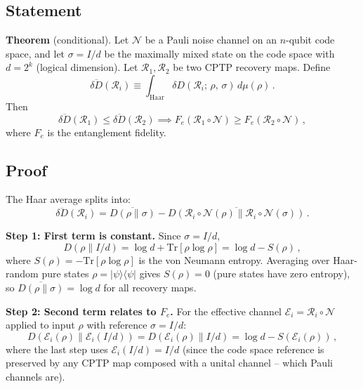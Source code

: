 \documentclass[12pt]{article}
\newcommand{\Tr}{\mathrm{Tr}}
\newcommand{\Petz}{\mathcal{R}}
\newcommand{\chan}{\mathcal{N}}
\newcommand{\dd}{\delta\!D}
\begin{document}
\subsection{Statement}

\textbf{Theorem} (conditional). Let $\chan$ be a Pauli noise channel on an $n$-qubit code space, and let $\sigma = I/d$ be the maximally mixed state on the code space with $d = 2^k$ (logical dimension). Let $\Petz_1, \Petz_2$ be two CPTP recovery maps. Define
\begin{equation}
  \overline{\dd}(\Petz_i) \equiv \int_{\text{Haar}} \dd(\Petz_i;\, \rho,\, \sigma)\, d\mu(\rho)\,.
\end{equation}
Then
\begin{equation}
  \overline{\dd}(\Petz_1) \leq \overline{\dd}(\Petz_2) \implies F_e(\Petz_1 \circ \chan) \geq F_e(\Petz_2 \circ \chan)\,,
\end{equation}
where $F_e$ is the entanglement fidelity.

\subsection{Proof}

The Haar average splits into:
\begin{equation}
  \overline{\dd}(\Petz_i) = \overline{D(\rho\|\sigma)} - \overline{D(\Petz_i \circ \chan(\rho)\|\Petz_i \circ \chan(\sigma))}\,.
\end{equation}

\textbf{Step 1: First term is constant.} Since $\sigma = I/d$,
\begin{equation}
  D(\rho\|I/d) = \log d + \Tr[\rho \log \rho] = \log d - S(\rho)\,,
\end{equation}
where $S(\rho) = -\Tr[\rho \log \rho]$ is the von Neumann entropy. Averaging over Haar-random pure states $\rho = |\psi\rangle\langle\psi|$ gives $S(\rho) = 0$ (pure states have zero entropy), so $\overline{D(\rho\|\sigma)} = \log d$ for all recovery maps.

\textbf{Step 2: Second term relates to $F_e$.} For the effective channel $\mathcal{E}_i = \Petz_i \circ \chan$ applied to input $\rho$ with reference $\sigma = I/d$:
\begin{equation}
  D(\mathcal{E}_i(\rho)\|\mathcal{E}_i(I/d)) = D(\mathcal{E}_i(\rho)\|I/d) = \log d - S(\mathcal{E}_i(\rho))\,,
\end{equation}
where the last step uses $\mathcal{E}_i(I/d) = I/d$ (since the code space reference is preserved by any CPTP map composed with a unital channel -- which Pauli channels are).
\end{document}
